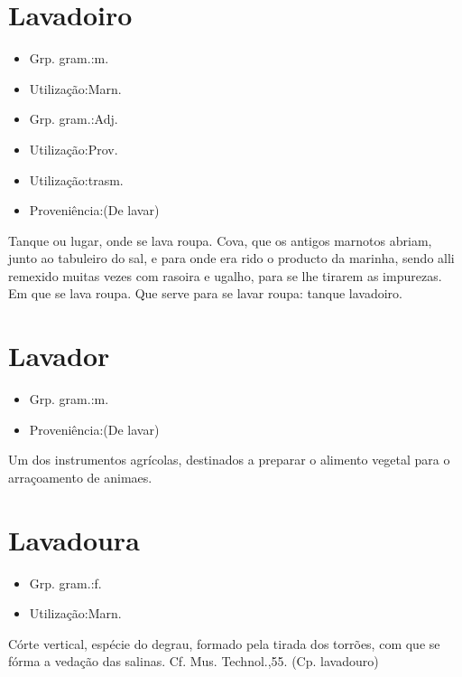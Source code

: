 \section{Lavadoiro}
\begin{itemize}
\item {Grp. gram.:m.}
\end{itemize}
\begin{itemize}
\item {Utilização:Marn.}
\end{itemize}
\begin{itemize}
\item {Grp. gram.:Adj.}
\end{itemize}
\begin{itemize}
\item {Utilização:Prov.}
\end{itemize}
\begin{itemize}
\item {Utilização:trasm.}
\end{itemize}
\begin{itemize}
\item {Proveniência:(De \textunderscore lavar\textunderscore )}
\end{itemize}
Tanque ou lugar, onde se lava roupa.
Cova, que os antigos marnotos abriam, junto ao tabuleiro do sal, e para onde era rido o producto da marinha, sendo alli remexido muitas vezes com rasoira e ugalho, para se lhe tirarem as impurezas.
Em que se lava roupa.
Que serve para se lavar roupa: \textunderscore tanque lavadoiro\textunderscore .
\section{Lavador}
\begin{itemize}
\item {Grp. gram.:m.}
\end{itemize}
\begin{itemize}
\item {Proveniência:(De \textunderscore lavar\textunderscore )}
\end{itemize}
Um dos instrumentos agrícolas, destinados a preparar o alimento vegetal para o arraçoamento de animaes.
\section{Lavadoura}
\begin{itemize}
\item {Grp. gram.:f.}
\end{itemize}
\begin{itemize}
\item {Utilização:Marn.}
\end{itemize}
Córte vertical, espécie do degrau, formado pela tirada dos torrões, com que se fórma a vedação das salinas. Cf. \textunderscore Mus. Technol.\textunderscore ,55.
(Cp. \textunderscore lavadouro\textunderscore )
